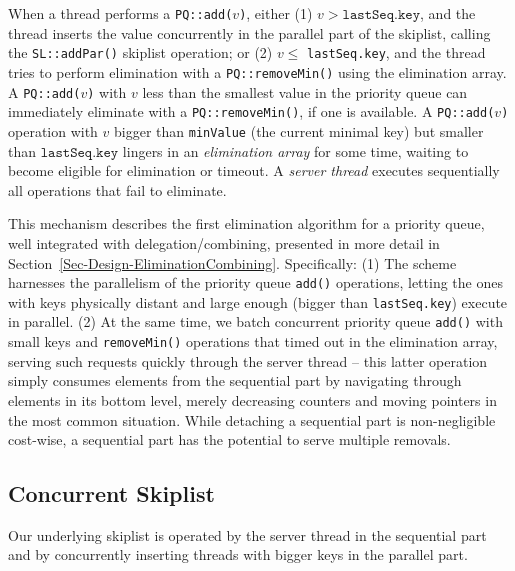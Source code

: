 
When a thread performs a \texttt{PQ::add($v$)}, either (1) $v > \mathtt{lastSeq.key}$, and the thread inserts the value concurrently in the parallel part of the skiplist, calling the \texttt{SL::addPar()} skiplist operation; or (2) $v \le$ \texttt{lastSeq.key}, and the thread tries to perform elimination with a \texttt{PQ::removeMin()} using the elimination array. 
A \texttt{PQ::add($v$)} with $v$ less than the smallest value in the priority queue can immediately eliminate with a \texttt{PQ::removeMin()}, if one is available. A \texttt{PQ::add($v$)} operation with $v$ bigger than \texttt{minValue} (the current minimal key) but smaller than $\mathtt{lastSeq.key}$ lingers in an \emph{elimination array} for some time, waiting to become eligible for elimination or timeout. A \emph{server thread} executes sequentially all operations that fail to eliminate.

This mechanism describes the first elimination algorithm for a priority queue, well integrated with delegation/combining, presented in more detail in Section~\ref{Sec-Design-EliminationCombining}.
Specifically: (1) The scheme harnesses the parallelism of the priority queue \texttt{add()} operations, letting the ones with keys physically distant and large enough (bigger than \texttt{lastSeq.key}) execute in parallel. (2) At the same time, we batch concurrent priority queue \texttt{add()} with small keys and \texttt{removeMin()} operations that timed out in the elimination array, serving such requests quickly through the server thread -- this latter operation simply consumes elements from the sequential part by navigating through elements in its bottom level, merely decreasing counters and moving pointers in the most common situation. While detaching a sequential part is non-negligible cost-wise, a sequential part has the potential to serve multiple removals.

\subsection{Concurrent Skiplist}
\label{Sec-Design-ConcurrentSkiplist}

Our underlying skiplist is operated by the server thread in the sequential part and by concurrently inserting threads with bigger keys in the parallel part.

